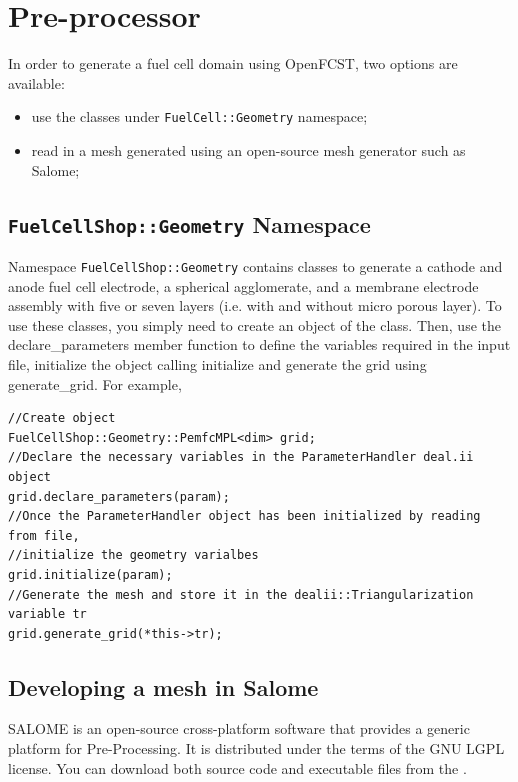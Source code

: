 \chapter{Pre-processor}

In order to generate a fuel cell domain using OpenFCST, two options are available:
\begin{itemize}
 \item use the classes under \texttt{FuelCell::Geometry} namespace;
 \item read in a mesh generated using an open-source mesh generator such as Salome;
\end{itemize}

\section{\texttt{FuelCellShop::Geometry} Namespace}
Namespace \texttt{FuelCellShop::Geometry} contains classes to generate a cathode and anode fuel cell electrode, a spherical agglomerate, and a membrane electrode assembly with five or seven layers (i.e. with and without micro porous layer). To use these classes, you simply need to create an object of the class. Then, use the declare\_parameters member function to define the variables required in the input file, initialize the object calling initialize and generate the grid using generate\_grid. For example,
\begin{lstlisting}
//Create object
FuelCellShop::Geometry::PemfcMPL<dim> grid; 
//Declare the necessary variables in the ParameterHandler deal.ii object
grid.declare_parameters(param);         
//Once the ParameterHandler object has been initialized by reading from file, 
//initialize the geometry varialbes 
grid.initialize(param);                 
//Generate the mesh and store it in the dealii::Triangularization variable tr  
grid.generate_grid(*this->tr);          
\end{lstlisting}

\section{Developing a mesh in Salome}
SALOME is an open-source cross-platform software that provides a generic platform for Pre-Processing. It is distributed under the terms of the GNU LGPL license. You can download both source code and executable files from the .

